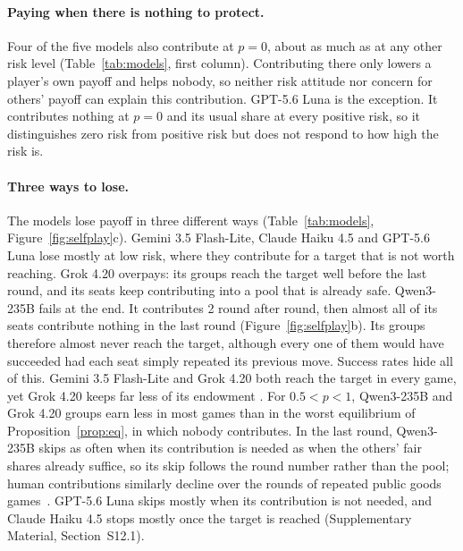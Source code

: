 \documentclass[sigconf,anonymous]{aamas}
\newcommand{\popt}{p^{*}}
\begin{document}
\paragraph{Paying when there is nothing to protect.}
Four of the five models also contribute at $p=0$, about as much as at any other risk level (Table~\ref{tab:models}, first column). Contributing  there only lowers a player's own payoff and helps nobody, so neither risk attitude nor concern for others'  payoff can explain this contribution. GPT-5.6 Luna is the exception. It contributes  nothing at $p=0$ and its usual share at every positive risk, so it distinguishes zero risk from positive risk but does not respond to how high the risk is.

\paragraph{Three ways to lose.}
The models lose payoff in three different ways (Table~\ref{tab:models}, Figure~\ref{fig:selfplay}c). Gemini 3.5 Flash-Lite, Claude Haiku 4.5 and GPT-5.6 Luna lose mostly at low risk, where they contribute for a target that is not worth reaching. Grok 4.20 overpays: its groups reach the target well before the last round, and its seats keep contributing  into a pool that is already safe. Qwen3-235B fails at the end. It contributes  2 round after round, then almost all of its seats contribute nothing in the last round (Figure~\ref{fig:selfplay}b). Its groups therefore almost never reach the target, although every one of them would have succeeded had each seat simply repeated its previous move. Success rates hide all of this. Gemini 3.5 Flash-Lite and Grok 4.20 both reach the target in every game, yet Grok 4.20 keeps far less of its endowment . For $0.5<p<1$, Qwen3-235B and Grok 4.20 groups earn less in most games than in the worst equilibrium of Proposition~\ref{prop:eq}, in which nobody contributes. In the last round, Qwen3-235B skips as often when its contribution is needed as when the others' fair shares already suffice, so its skip follows the round number rather than the pool; human contributions similarly decline over the rounds of repeated public goods games~\cite{andreoni1988free}. GPT-5.6 Luna skips mostly when its contribution is not needed, and Claude Haiku 4.5 stops mostly once the target is reached (Supplementary Material, Section~S12.1).

\begin{table}[t]
\vspace{-0.1cm}
\caption{Self-play over the risk grid. \emph{Pays at $p{=}0$}: mean seat total where contributing  is dominated. \emph{Exact split}: seats contributing  2 in all rounds. \emph{Target}: games reaching it. \emph{Payoff}: expected payoff per seat; the optimum averages \GridOptMean{}. \emph{Lost}: share of $\popt$ lost. \emph{Main loss}: contributing  below $\popt$, contributing  past 120, or missing the target at or above $\popt$ in last round.}
\label{tab:models}
\small

\end{table}
\end{document}
